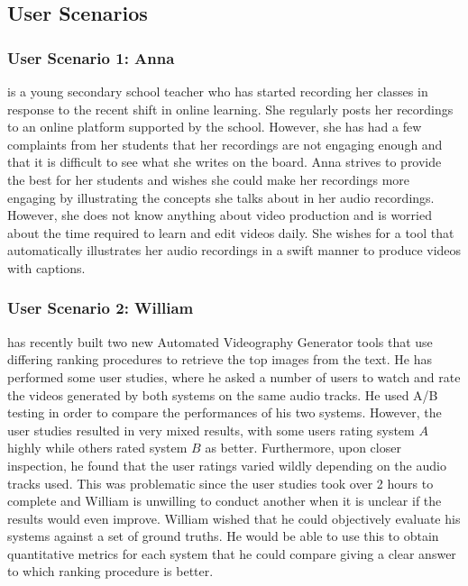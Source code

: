 \documentclass{l4proj}
\begin{document}
\subsection{User Scenarios}
\subsubsection{User Scenario 1: Anna} is a young secondary school teacher who has started recording her classes in response to the recent shift in online learning. She regularly posts her recordings to an online platform supported by the school. However, she has had a few complaints from her students that her recordings are not engaging enough and that it is difficult to see what she writes on the board. Anna strives to provide the best for her students and wishes she could make her recordings more engaging by illustrating the concepts she talks about in her audio recordings. However, she does not know anything about video production and is worried about the time required to learn and edit videos daily. She wishes for a tool that automatically illustrates her audio recordings in a swift manner to produce videos with captions.

\subsubsection{User Scenario 2: William} has recently built two new Automated Videography Generator tools that use differing ranking procedures to retrieve the top images from the text. He has performed some user studies, where he asked a number of users to watch and rate the videos generated by both systems on the same audio tracks. He used A/B testing in order to compare the performances of his two systems. However, the user studies resulted in very mixed results, with some users rating system $A$ highly while others rated system $B$ as better. Furthermore, upon closer inspection, he found that the user ratings varied wildly depending on the audio tracks used. This was problematic since the user studies took over 2 hours to complete and William is unwilling to conduct another when it is unclear if the results would even improve. William wished that he could objectively evaluate his systems against a set of ground truths. He would be able to use this to obtain quantitative metrics for each system that he could compare giving a clear answer to which ranking procedure is better.
\end{document}

